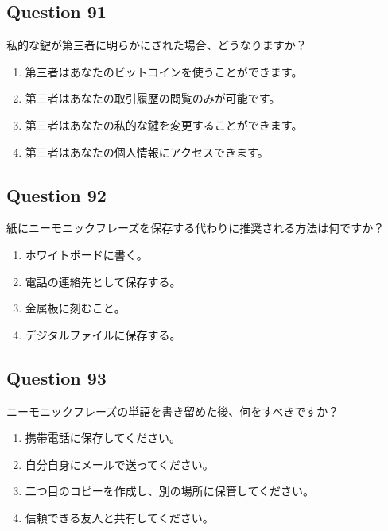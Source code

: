 \documentclass[12pt,a4paper]{article}
\begin{document}
\bigskip


\subsection*{Question 91}
私的な鍵が第三者に明らかにされた場合、どうなりますか？

\begin{enumerate}[label=\Alph*., leftmargin=*]
\item 第三者はあなたのビットコインを使うことができます。
\item 第三者はあなたの取引履歴の閲覧のみが可能です。
\item 第三者はあなたの私的な鍵を変更することができます。
\item 第三者はあなたの個人情報にアクセスできます。
\end{enumerate}

\bigskip


\subsection*{Question 92}
紙にニーモニックフレーズを保存する代わりに推奨される方法は何ですか？

\begin{enumerate}[label=\Alph*., leftmargin=*]
\item ホワイトボードに書く。
\item 電話の連絡先として保存する。
\item 金属板に刻むこと。
\item デジタルファイルに保存する。
\end{enumerate}

\bigskip


\subsection*{Question 93}
ニーモニックフレーズの単語を書き留めた後、何をすべきですか？

\begin{enumerate}[label=\Alph*., leftmargin=*]
\item 携帯電話に保存してください。
\item 自分自身にメールで送ってください。
\item 二つ目のコピーを作成し、別の場所に保管してください。
\item 信頼できる友人と共有してください。
\end{enumerate}

\bigskip
\end{document}
